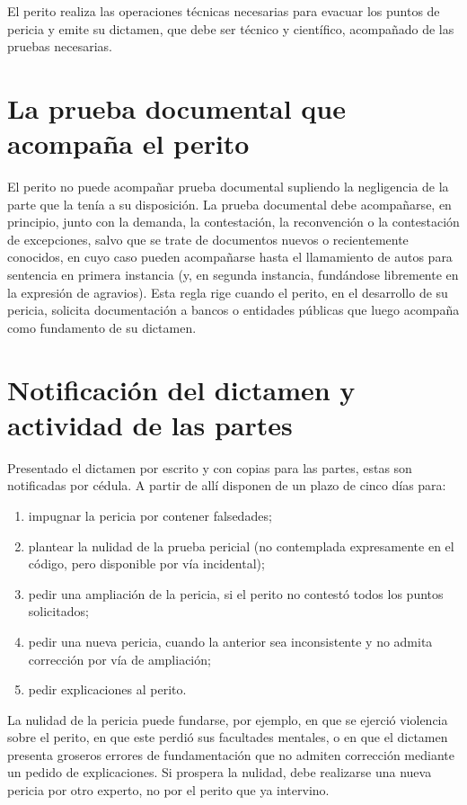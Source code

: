 \documentclass[12pt,oneside]{book}
\begin{document}
El perito realiza las operaciones técnicas necesarias para evacuar los puntos de pericia y emite su dictamen, que debe ser técnico y científico, acompañado de las pruebas necesarias.

\section{La prueba documental que acompaña el perito}

El perito no puede acompañar prueba documental supliendo la negligencia de la parte que la tenía a su disposición. La prueba documental debe acompañarse, en principio, junto con la demanda, la contestación, la reconvención o la contestación de excepciones, salvo que se trate de documentos nuevos o recientemente conocidos, en cuyo caso pueden acompañarse hasta el llamamiento de autos para sentencia en primera instancia (y, en segunda instancia, fundándose libremente en la expresión de agravios). Esta regla rige cuando el perito, en el desarrollo de su pericia, solicita documentación a bancos o entidades públicas que luego acompaña como fundamento de su dictamen.

\section{Notificación del dictamen y actividad de las partes}

Presentado el dictamen por escrito y con copias para las partes, estas son notificadas por cédula. A partir de allí disponen de un plazo de cinco días para:

\begin{enumerate}[label=\alph*)]
    \item impugnar la pericia por contener falsedades;
    \item plantear la nulidad de la prueba pericial (no contemplada expresamente en el código, pero disponible por vía incidental);
    \item pedir una ampliación de la pericia, si el perito no contestó todos los puntos solicitados;
    \item pedir una nueva pericia, cuando la anterior sea inconsistente y no admita corrección por vía de ampliación;
    \item pedir explicaciones al perito.
\end{enumerate}

La nulidad de la pericia puede fundarse, por ejemplo, en que se ejerció violencia sobre el perito, en que este perdió sus facultades mentales, o en que el dictamen presenta groseros errores de fundamentación que no admiten corrección mediante un pedido de explicaciones. Si prospera la nulidad, debe realizarse una nueva pericia por otro experto, no por el perito que ya intervino.
\end{document}
